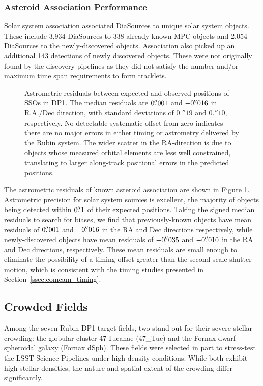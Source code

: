 \subsubsection{Asteroid Association Performance}
\label{ssec:asteroid_association}

Solar system association associated \nsolarsystemsources DiaSources to \nsolarsystemobjects unique solar system objects.
These include 3,934 DiaSources to 338 already-known \gls{MPC} objects and 2,054 DiaSources to the \nnewasteroiddiscoveries  newly-discovered objects.
Association also picked up an additional 143 detections of newly discovered objects.
These were not originally found by the discovery pipelines as they did not satisfy the number and/or maximum time span requirements to form tracklets.

\begin{figure}[htb!]
\caption{Astrometric residuals between expected and observed positions of SSOs in \gls{DP1}. 
The median residuals are $0\mbox{$.\!\!^{\prime\prime}$}001$ and $-0\mbox{$.\!\!^{\prime\prime}$}016$ in R.A./Dec direction, with  standard deviations of $0.''19$ and $0.''10$, respectively. 
No detectable systematic offset from zero indicates there are no major errors in either timing or astrometry delivered by the Rubin system. 
The wider scatter in the RA-direction is due to objects whose measured orbital elements are less well constrained, translating to larger along-track positional errors in the predicted positions.}
\label{fig:sso_residuals}
\end{figure}

The astrometric residuals of known asteroid association are shown in Figure \ref{fig:sso_residuals}.
Astrometric precision for solar system sources is excellent, the majority of objects being detected within $0\mbox{$.\!\!^{\prime\prime}$}1$ of their expected positions.
Taking the signed median residuals to search for biases, we find that previously-known objects have mean residuals of $0\mbox{$.\!\!^{\prime\prime}$}001$ and $-0\mbox{$.\!\!^{\prime\prime}$}016$ in the RA and Dec directions respectively, while newly-discovered objects have mean residuals of $-0\mbox{$.\!\!^{\prime\prime}$}035$ and $-0\mbox{$.\!\!^{\prime\prime}$}010$ in the \gls{RA} and Dec directions, respectively.
These mean residuals are small enough to eliminate the possibility of a timing offset greater than the second-scale shutter motion, which is consistent with the timing studies presented in Section~\ref{ssec:comcam_timing}.

\subsection{Crowded Fields}
Among the seven Rubin DP1 target fields, two stand out for their severe stellar crowding: the globular cluster 47\,Tucanae (47\_Tuc) and the Fornax dwarf spheroidal galaxy (Fornax dSph).
These fields were selected in part to stress-test the LSST Science Pipelines under high-density conditions. 
While both exhibit high stellar densities, the nature and spatial extent of the crowding differ significantly.

